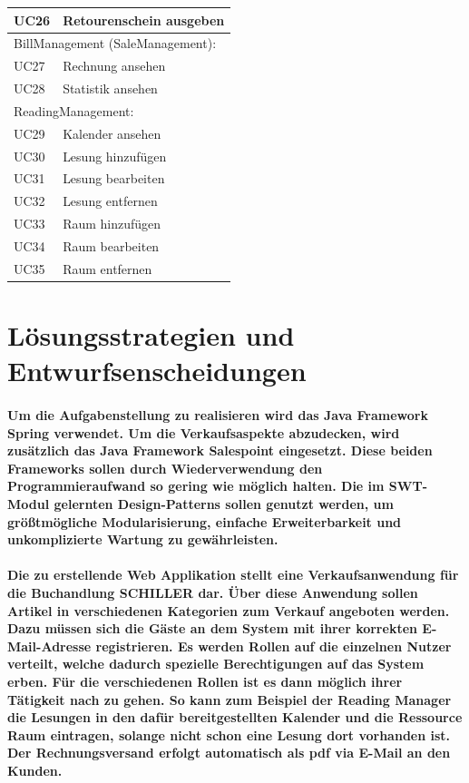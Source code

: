 \documentclass[a4paper]{article}
\begin{document}
\begin{longtable}{|p{100px}|p{250px}|}
	UC26 & Retourenschein ausgeben  \\ \hline
	\multicolumn{2}{|l|}{BillManagement (SaleManagement):}  \\ \hline
	UC27 & Rechnung ansehen \\ \hline
	UC28 & Statistik ansehen \\ \hline
	\multicolumn{2}{|l|}{ReadingManagement:} \\ \hline
	UC29 & Kalender ansehen \\ \hline
	UC30 & Lesung hinzufügen \\ \hline
	UC31 & Lesung bearbeiten \\ \hline
	UC32 & Lesung entfernen \\ \hline
	UC33 & Raum hinzufügen \\ \hline
	UC34 & Raum bearbeiten \\ \hline
	UC35 & Raum entfernen \\ \hline
\end{longtable}

\section{Lösungsstrategien und Entwurfsenscheidungen}

\paragraph{Um die Aufgabenstellung zu realisieren wird das Java Framework Spring verwendet. Um die Verkaufsaspekte abzudecken, wird zusätzlich das Java Framework Salespoint eingesetzt. Diese beiden Frameworks sollen durch Wiederverwendung den Programmieraufwand so gering wie möglich halten. Die im SWT-Modul gelernten Design-Patterns sollen genutzt werden, um größtmögliche Modularisierung, einfache Erweiterbarkeit und unkomplizierte Wartung zu gewährleisten.}

\paragraph{Die zu erstellende Web Applikation stellt eine Verkaufsanwendung für die Buchandlung SCHILLER dar. Über diese Anwendung sollen Artikel in verschiedenen Kategorien zum Verkauf angeboten werden. Dazu müssen sich die Gäste an dem System mit ihrer korrekten E-Mail-Adresse registrieren. Es werden Rollen auf die einzelnen Nutzer verteilt, welche dadurch spezielle Berechtigungen auf das System erben. Für die verschiedenen Rollen ist es dann möglich ihrer Tätigkeit nach zu gehen. So kann zum Beispiel der Reading Manager die Lesungen in den dafür bereitgestellten Kalender und die Ressource Raum eintragen, solange nicht schon eine Lesung dort vorhanden ist. Der Rechnungsversand erfolgt automatisch als pdf via E-Mail an den Kunden.}
\end{document}
